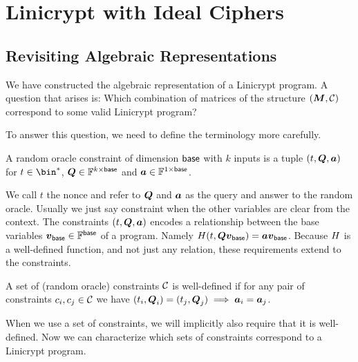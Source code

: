 \chapter{Linicrypt with Ideal Ciphers}

\section{Revisiting Algebraic Representations}
We have constructed the algebraic representation of a Linicrypt program.
A question that arises is: Which combination of matrices of the structure $(\boldsymbol{M}, \mathcal{C})$
correspond to some valid Linicrypt program?

To answer this question, we need to define the terminology more carefully.

\begin{defn}
A random oracle constraint of dimension $\mathsf{base}$ with $k$ inputs is a tuple $(t, \boldsymbol Q, \boldsymbol a)$ for
$t \in \bin^*$, $\boldsymbol{Q} \in \mathbb{F}^{k \times \mathsf{base}}$ and $\boldsymbol a \in \mathbb{F}^{1 \times \mathsf{base}}$.
\end{defn}

We call $t$ the nonce and refer to $\boldsymbol{Q}$ and $\boldsymbol a$ as the query and answer to the random oracle.
Usually we just say constraint when the other variables are clear from the context.
The constraints $(t, \boldsymbol{Q}, \boldsymbol a)$ encodes a relationship between the base variables $\boldsymbol v_{\mathsf{base}} \in \mathbb{F}^{\mathsf{base}}$ of a program.
Namely $H(t, \boldsymbol{Q} \boldsymbol v_{\mathsf{base}}) = \boldsymbol a \boldsymbol v_{\mathsf{base}}$.
Because $H$ is a well-defined function,
and not just any relation,
these requirements extend to the constraints.

\begin{defn}
A set of (random oracle) constraints $\mathcal{C}$ is well-defined if for any pair of constraints 
$c_i, c_j \in \mathcal{C}$ we have $(t_i,\boldsymbol{Q}_i) = (t_j, \boldsymbol{Q}_j) \implies \boldsymbol a_i = \boldsymbol a_j$.
\end{defn}

When we use a set of constraints, we will implicitly also require that it is well-defined.
Now we can characterize which sets of constraints correspond to a Linicrypt program.

